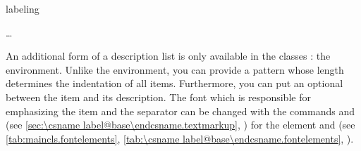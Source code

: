 \begin{Declaration}
  \begin{Environment}{labeling}
    \begin{Body}
      \dots
      \BodyDots
    \end{Body}
  \end{Environment}
\end{Declaration}%
An additional form of a description list is only available in the
{\KOMAScript} classes%
: the
 environment. Unlike the
 environment, you can provide a pattern whose length
determines the indentation of all items. Furthermore, you can put an optional
 between the item and its description.  The
font%
 which is responsible for emphasizing the item and the separator can be changed
with the commands  and  (see \autoref{sec:\csname
  label@base\endcsname.textmarkup}, ) for the element
 and
 (see
\ifCommonscrextend
\autoref{tab:maincls.fontelements},
\else
\autoref{tab:\csname label@base\endcsname.fontelements},
%
\fi).
\ifCommonscrlttr\par\else
